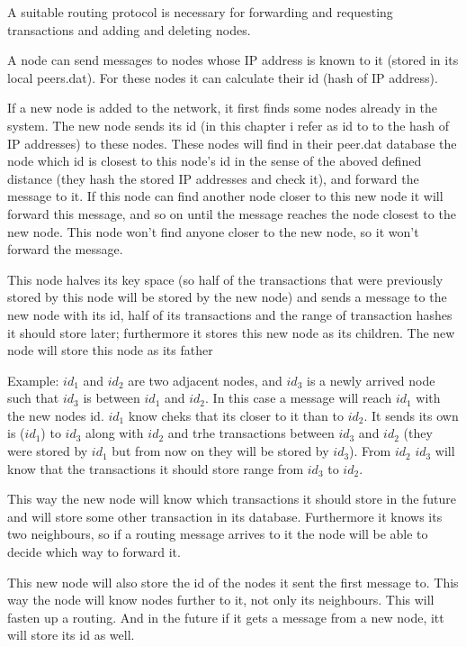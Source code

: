 \documentclass[a4paper,12pt]{article}
\begin{document}
A suitable routing protocol is necessary for forwarding and requesting transactions and adding and deleting nodes.

A node can send messages to nodes whose IP address is known to it (stored in its local peers.dat). For these nodes it can calculate their id (hash of IP address).

If a new node is added to the network,  it first finds some nodes already in the system.
The new node sends its id  (in this chapter i refer as id to to the hash of IP addresses) to these nodes. These nodes will find in their peer.dat database the node which id is closest to this node's id in the sense of the aboved defined distance (they hash the stored IP addresses and check it), and forward the message to it. If this node can find another node closer to this new node it will forward this message, and so on until the message reaches the node closest to the new node. This node won't find anyone closer to the new node, so it won't forward the message.

This node halves its key space (so half of the transactions that were previously stored by this node will be stored by the new node) and sends a message to the new node with its id, half of its transactions and the range of transaction hashes it should store later; furthermore it stores this new node as its children. The new node will store this node as its father

Example: $id_1$ and $id_2$ are two adjacent nodes, and $id_3$ is a newly arrived node such that $id_3$ is between $id_1$ and $id_2$. In this case a message will reach $id_1$ with the new nodes id. $id_1$ know cheks that its closer to it than to $id_2$. It sends its own is ($id_1$) to $id_3$ along with $id_2$ and trhe transactions between $id_3$ and $id_2$ (they were stored by $id_1$ but from now on they will be stored by $id_3$). From $id_2$ $id_3$ will know that the transactions it should store range from $id_3$ to $id_2$.

This way the new node will know which transactions it should store in the future and will store some other transaction in its database. Furthermore it knows its two neighbours, so if a routing message arrives to it the node will be able to decide which way to forward it.

This new node will also store the id of the nodes it sent the first message to. This way the node will know nodes further to it, not only its neighbours. This will fasten up a routing. And in the future if it gets a message from a new node, itt will store its id as well.
\end{document}
